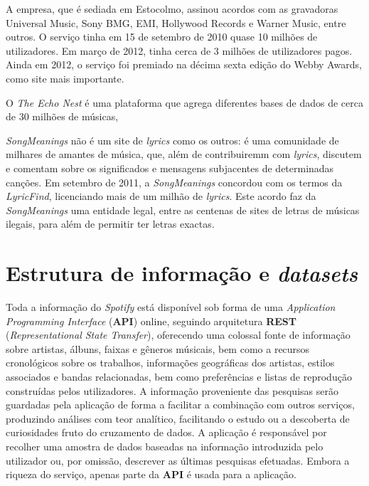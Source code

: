\documentclass[twocolumn,twoside,11pt,a4paper]{article}
\begin{document}
A empresa, que é sediada em Estocolmo, assinou acordos com as gravadoras Universal
Music, Sony BMG, EMI, Hollywood Records e Warner Music, entre outros. O serviço tinha em
15 de setembro de 2010 quase 10 milhões de utilizadores. Em março de 2012, tinha cerca
de 3 milhões de utilizadores pagos. Ainda em 2012, o serviço foi premiado na décima
sexta edição do Webby Awards, como site mais importante.


O \textit{The Echo Nest} é uma plataforma que agrega diferentes bases de dados de cerca
de 30 milhões de músicas,


\textit{SongMeanings} não é um site de \textit{lyrics} como os outros: é uma
comunidade de milhares de amantes de música, que, além de contribuiremm com
\textit{lyrics}, discutem e comentam sobre os significados e mensagens subjacentes de
determinadas canções.
Em setembro de 2011, a \textit{SongMeanings} concordou com os termos da
\textit{LyricFind}, licenciando mais de um milhão de \textit{lyrics}. Este acordo faz da
\textit{SongMeanings} uma entidade legal, entre as centenas de sites de letras de
músicas ilegais, para além de permitir ter letras exactas.



\section{Estrutura de informação e \textit{datasets}}\label{sec:structure}

Toda a informação do \textit{Spotify} está disponível sob forma de uma
\textit{Application Programming Interface} (\textbf{API}) online, seguindo arquitetura
\textbf{REST} (\textit{Representational State Transfer}), oferecendo uma
colossal fonte de informação sobre artistas, álbuns, faixas e gêneros músicais, bem
como a recursos cronológicos sobre os trabalhos, informações geográficas dos
artistas, estilos associados e bandas relacionadas, bem como preferências e listas de
reprodução construídas pelos utilizadores.
A informação proveniente das pesquisas serão guardadas pela aplicação de forma a facilitar
a combinação com outros serviços, produzindo análises com teor analítico, facilitando o
estudo ou a descoberta de curiosidades fruto do cruzamento de dados.
A aplicação é responsável por recolher uma amostra de dados baseadas na informação introduzida
pelo utilizador ou, por omissão, descrever as últimas pesquisas efetuadas.
Embora a riqueza do serviço, apenas parte da \textbf{API} é usada para a aplicação.
\end{document}
